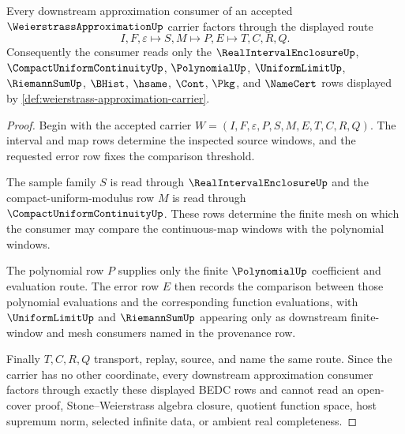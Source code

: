 \begin{theorem}
\label{thm:weierstrass-approximation-polynomial-handoff}
Every downstream approximation consumer of an accepted $\WeierstrassApproximationUp$ carrier factors through the displayed route
$$
I,F,\varepsilon \longmapsto S,M \longmapsto P,E \longmapsto T,C,R,Q .
$$
Consequently the consumer reads only the $\RealIntervalEnclosureUp$, $\CompactUniformContinuityUp$, $\PolynomialUp$, $\UniformLimitUp$, $\RiemannSumUp$, $\BHist$, $\hsame$, $\Cont$, $\Pkg$, and $\NameCert$ rows displayed by \autoref{def:weierstrass-approximation-carrier}.
\end{theorem}
\begin{proof}
Begin with the accepted carrier $W=(I,F,\varepsilon,P,S,M,E,T,C,R,Q)$. The interval and map rows determine the inspected source windows, and the requested error row fixes the comparison threshold.

The sample family $S$ is read through $\RealIntervalEnclosureUp$ and the compact-uniform-modulus row $M$ is read through $\CompactUniformContinuityUp$. These rows determine the finite mesh on which the consumer may compare the continuous-map windows with the polynomial windows.

The polynomial row $P$ supplies only the finite $\PolynomialUp$ coefficient and evaluation route. The error row $E$ then records the comparison between those polynomial evaluations and the corresponding function evaluations, with $\UniformLimitUp$ and $\RiemannSumUp$ appearing only as downstream finite-window and mesh consumers named in the provenance row.

Finally $T,C,R,Q$ transport, replay, source, and name the same route. Since the carrier has no other coordinate, every downstream approximation consumer factors through exactly these displayed BEDC rows and cannot read an open-cover proof, Stone--Weierstrass algebra closure, quotient function space, host supremum norm, selected infinite data, or ambient real completeness.
\end{proof}

